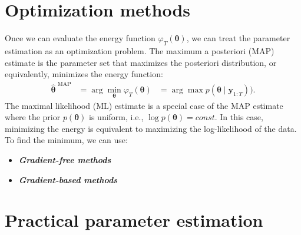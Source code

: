 \section{Optimization methods}
Once we can evaluate the energy function $\varphi_T(\boldsymbol{\theta})$, we can treat the parameter estimation as an optimization problem. 
The maximum a posteriori (MAP) estimate is the parameter set that maximizes the posteriori distribution, or equivalently, minimizes the energy function: 
    \begin{align}
        \boldsymbol{\hat{\theta}}^{\text{ MAP}} &= \arg \min_{\boldsymbol{\theta}} \varphi_T(\boldsymbol{\theta}) &= \arg \max p(\boldsymbol{\theta} \mid \mathbf{y}_{1:T})).  
    \end{align}
The maximal likelihood (ML) estimate is a special case of the MAP estimate where the prior $p(\boldsymbol{\theta})$ is uniform, i.e., $\log p(\boldsymbol{\theta})=const$. In this case, minimizing the energy is equivalent to maximizing the log-likelihood of the data. To find the minimum, we can use: 
\begin{itemize}
    \item \textbf{\textit{Gradient-free methods}}
    \item \textbf{\textit{Gradient-based methods}}
\end{itemize}

\section{Practical parameter estimation}
